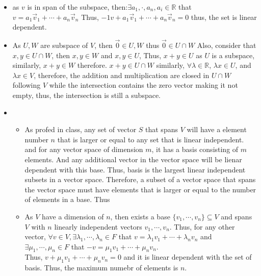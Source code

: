 \documentclass{article}
\begin{document}
\begin{itemize}
\begin{align}
\begin{matrix}
            a_1 = -1\\
            a_1 = -\frac{6}{7}
        \end{matrix} \right.
    \end{align}
    Which raises a contradiction and thus, such \(a_1,a_2\) does not exist thus, it is not in the span.
    \item[4.] as \(v\) is in span of the subspace, then:\(\exists {a_1,\cdot,a_n}, a_i\in\mathbb{R}\) that \\
    \(v = a_1\overrightarrow{v}_1+\cdots +a_n\overrightarrow{v}_n \)
    Thus, \(-1v+a_1\overrightarrow{v}_1+\cdots +a_n\overrightarrow{v}_n=0\) thus, the set is linear dependent.
    \newpage
    \item [5.] As \(U,W\) are subspace of \(V\), then \(\overrightarrow{0}\in U,W\) thus \(\overrightarrow{0}\in U\cap W\)
    Also, consider that \(x,y\in U\cap W\), then  \(x,y\in W\) and \(x,y\in U\), Thus, \(x+y\in U\) as \(U\) is a subspace, 
    similarly, \(x+y\in W\) therefore. \(x+y\in U\cap W\) similarly, \(\forall \lambda \in \mathbb{R}\), \(\lambda x \in U\), and \(\lambda x \in V\), therefore, the addition
    and multiplication are closed in \(U\cap W\) following \(V\) while the intersection contains the zero vector making it not empty, thus, the intersection is still a subspace.
    \item [6.] 
    \begin{itemize}
    \item [a)] As profed in class, any set of vector \(S\) that spans \(V\) will have a element number \(n\) that is larger or equal to any set that is linear independent.
    and for any vector space of dimension \(m\), it has a basis consisting of \(m\) elements. And any additional vector in the vector space will be lienar dependent with this base. Thus, basis is 
    the largest linear independent subsets in a vector space. Therefore, a subset of a vector space that spans the vector space must have elements that is larger or equal to the
    number of elements in a base. Thus
    \item [b)] As \(V\) have a dimension of \(n\), then exists a base \(\{v_1,\cdots,v_n\}\subseteq V\) and spans \(V\) with \(n\) linearly independent vectors \(v_1,\cdots,v_n\).
    Thus, for any other vector, \(\forall v\in V,\exists \lambda_1,\cdots,\lambda_n\in F\) that \(v=\lambda_1v_1+\cdots+\lambda_nv_n\)
    and \(\exists \mu_1,\cdots,\mu_n\in F\) that \(-v=\mu_1v_1+\cdots+\mu_nv_n\).\\ Thus, \(v+\mu_1v_1+\cdots+\mu_nv_n=0\) and it is linear dependent with the set of basis. Thus, the maximum numebr of elements is \(n\).


\end{itemize}
\end{itemize}
\end{document}
